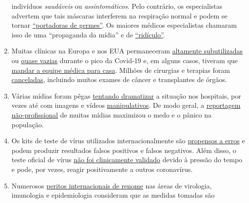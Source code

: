 \begin{enumerate}
  indivíduos \emph{saudáveis} ou \emph{assintomáticos}. Pelo contrário,
  os especialistas advertem que tais máscaras interferem na respiração
  normal e podem se tornar
  \href{https://www.independent.co.uk/news/health/coronavirus-news-face-masks-increase-risk-infection-doctor-jenny-harries-a9396811.html}{``portadoras
  de germes''}. Os maiores médicos especialistas chamaram isso de uma
  ``propaganda da mídia'' e de
  \href{https://www.aerztezeitung.de/Politik/Montgomery-haelt-Maskenpflicht-fuer-falsch-408844.html}{``ridículo''}.
\item
  Muitas clínicas na Europa e nos EUA permaneceram
  \href{https://www.hsj.co.uk/acute-care/nhs-hospitals-have-four-times-more-empty-beds-than-normal/7027392.article}{altamente
  subutilizadas} ou
  \href{https://www.sfchronicle.com/bayarea/article/Stanford-hospital-system-to-cut-pay-20-furlough-15227591.php}{quase
  vazias} durante o pico da Covid-19 e, em alguns casos, tiveram que
  \href{https://www.usatoday.com/story/news/health/2020/04/02/coronavirus-pandemic-jobs-us-health-care-workers-furloughed-laid-off/5102320002/}{mandar
  a equipe médica para casa}. Milhões de cirurgias e terapias foram
  \href{https://www.birmingham.ac.uk/news/latest/2020/05/covid-disruption-28-million-surgeries-cancelled.aspx}{canceladas},
  incluindo muitos exames de câncer e transplantes de órgãos.
\item
  Várias mídias foram pêgas
  \href{https://nypost.com/2020/04/01/cbs-admits-to-using-footage-from-italy-in-report-about-nyc/}{tentando
  dramatizar} a situação nos hospitais, por vezes até com imagens e
  vídeos
  \href{https://www.wsj.com/articles/cbs-says-fake-news-wasnt-theirs-11588789238}{manipulativos}.
  De modo geral, a
  \href{https://onlinelibrary.wiley.com/doi/full/10.1111/eci.13222}{reportagem
  não-profissional} de muitas mídias maximizou o medo e o pânico na
  população.
\item
  Os kits de teste de vírus utilizados internacionalmente são
  \href{https://www.ncbi.nlm.nih.gov/pubmed/32219885}{propensos a erros}
  e podem produzir resultados falsos positivos e falsos negativos. Além
  disso, o teste oficial de vírus
  \href{https://www.youtube.com/watch?v=p_AyuhbnPOI}{não foi
  clinicamente validado} devido à pressão do tempo e pode, por vezes,
  reagir positivamente a outros coronavírus.
\item
  Numerosos
  \href{https://off-guardian.org/2020/03/24/12-experts-questioning-the-coronavirus-panic/}{peritos
  internacionais de renome} nas áreas de virologia, imunologia e
  epidemiologia consideram que as medidas tomadas são

\end{enumerate}

